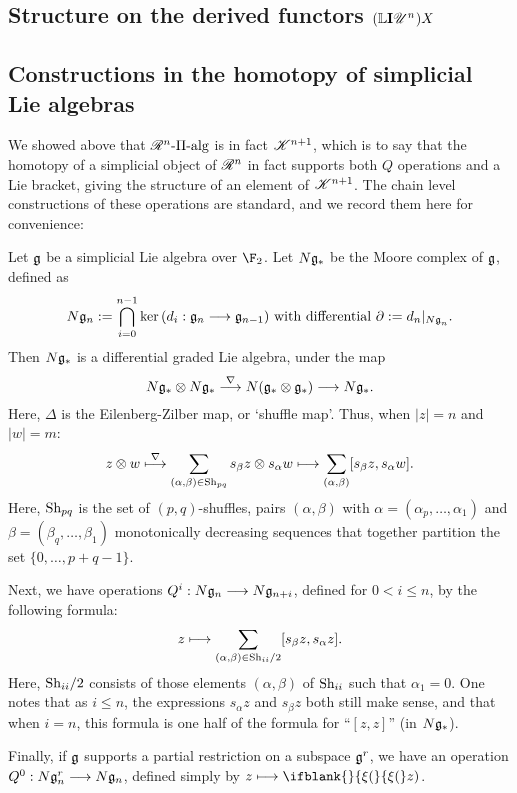 \documentclass[11pt]{article}
\newcommand{\PRLie}[1]{\scrR^{#1}}%
\newcommand{\LL}[1]{{\scrK}^{#1}}%
\newcommand{\nontop}[1]{\scrU^{#1}}%
\newcommand{\PiAlg}[1]{#1\textup{-$\Pi$-alg}}
\newcommand{\Ind}[2][]{\mathbf{I}{#2}_{#1}}%
\newcommand{\restn}[2][]{\ifblank{#1}{\xi{#2}}{\xi_{#1}{#2}}}%
\newcommand{\derived}{\mathbb{L}}
\renewcommand{\Q}{Q}
\newcommand{\Shuffles}[2]{\textup{Sh}_{#1#2}}
\newcommand{\HalfShuffles}[2]{\textup{Sh}_{#1#2}/2}
\begin{document}
\begin{LieLambdaStructureOnKoszul}
\section{Structure on the derived functors $(\derived\Ind{\nontop{n}})X$}
\subsection{Constructions in the homotopy of simplicial Lie algebras}
We showed above that $\PiAlg{\PRLie{n}}$ is in fact $\LL{n+1}$, which is to say that the homotopy of a simplicial object of $\PRLie{n}$ in fact supports both $\Q$ operations and a Lie bracket, giving the structure of an element of $\LL{n+1}$. The chain level constructions of these operations are standard, and we record them here for convenience:

Let $\mathfrak{g}$ be a simplicial Lie algebra over $\F_2$. Let $N\mathfrak{g}_*$ be the Moore complex of $\mathfrak{g}$, defined as
\[N\mathfrak{g}_n:=\bigcap_{i=0}^{n-1}\textup{ker}\,(d_i:\mathfrak{g}_n\longrightarrow\mathfrak{g}_{n-1})\textup{ with differential }\partial:=d_n|_{{N\mathfrak{g}}_n}.\]
Then $N\mathfrak{g}_*$ is a differential graded Lie algebra, under the map
\[N\mathfrak{g}_*\otimes N\mathfrak{g}_*\overset{\nabla}{\longrightarrow}N(\mathfrak{g}_*\otimes \mathfrak{g}_*)\longrightarrow N\mathfrak{g}_*.\]
Here, $\Delta$ is the Eilenberg-Zilber map, or `shuffle map'. Thus, when $|z|=n$ and $|w|=m$:
\[z\otimes w\overset{\nabla}{\mapsto}\sum_{(\alpha,\beta)\in\Shuffles{p}{q}}s_\beta z\otimes s_\alpha w\mapsto \sum_{(\alpha,\beta)}[s_\beta z, s_\alpha w].\]
Here, $\Shuffles{p}{q}$ is the set of $(p,q)$-shuffles, pairs $(\alpha,\beta)$ with $\alpha=(\alpha_p,\ldots,\alpha_1)$ and $\beta=(\beta_q,\ldots,\beta_1)$ monotonically decreasing sequences that together partition the set $\{0,\ldots,p+q-1\}$.

Next, we have operations $\Q^i:N\frakg_n\to N\frakg_{n+i}$, defined for $0<i\leq n$, by the following formula:
\[z\mapsto \sum_{{(\alpha,\beta)\in\HalfShuffles{i}{i}}}[s_\beta z, s_\alpha z].\]
Here, $\HalfShuffles{i}{i}$ consists of those elements $(\alpha,\beta)$ of $\Shuffles{i}{i}$ such that $\alpha_1=0$.
One notes that as $i\leq n$, the expressions $s_\alpha z$ and $s_\beta z$ both still make sense, and that when $i=n$, this formula is one half of the formula for ``$[z,z]$'' (in $N\mathfrak{g}_*$).

Finally, if $\mathfrak{g}$ supports a partial restriction on a subspace $\mathfrak{g}^r$, we have an operation $\Q^0:N\frakg^r_n\to N\frakg_n$, defined simply by $z\mapsto\restn(z)$.


\end{LieLambdaStructureOnKoszul}
\end{document}
